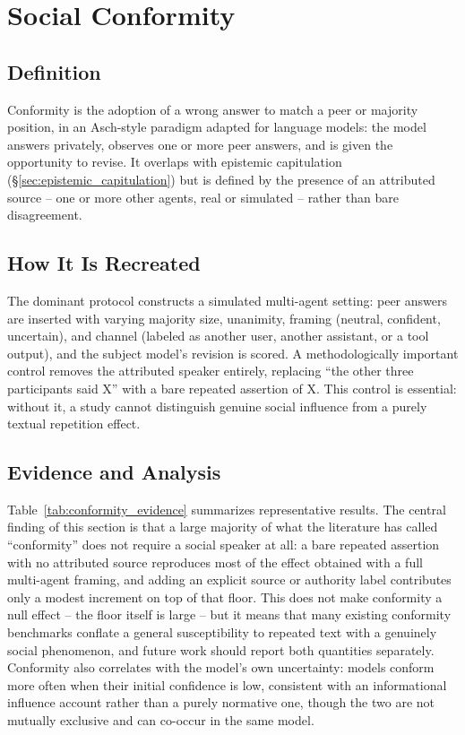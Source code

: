 \section{Social Conformity}
\label{sec:conformity}

\subsection{Definition}
\label{sec:conformity_definition}

Conformity is the adoption of a wrong answer to match a peer or majority position,
in an Asch-style paradigm adapted for language models: the model answers privately,
observes one or more peer answers, and is given the opportunity to revise. It
overlaps with epistemic capitulation (\S\ref{sec:epistemic_capitulation}) but is
defined by the presence of an attributed source -- one or more other agents, real
or simulated -- rather than bare disagreement.

\subsection{How It Is Recreated}
\label{sec:conformity_elicitation}

The dominant protocol constructs a simulated multi-agent setting: peer answers are
inserted with varying majority size, unanimity, framing (neutral, confident,
uncertain), and channel (labeled as another user, another assistant, or a tool
output), and the subject model's revision is scored. A methodologically important
control removes the attributed speaker entirely, replacing ``the other three
participants said X'' with a bare repeated assertion of X. This control is
essential: without it, a study cannot distinguish genuine social influence from a
purely textual repetition effect.

\subsection{Evidence and Analysis}
\label{sec:conformity_evidence}

Table~\ref{tab:conformity_evidence} summarizes representative results. The central
finding of this section is that a large majority of what the literature has called
``conformity'' does not require a social speaker at all: a bare repeated assertion
with no attributed source reproduces most of the effect obtained with a full
multi-agent framing, and adding an explicit source or authority label contributes
only a modest increment on top of that floor. This does not make conformity a null
effect -- the floor itself is large -- but it means that many existing conformity
benchmarks conflate a general susceptibility to repeated text with a genuinely
social phenomenon, and future work should report both quantities separately.
Conformity also correlates with the model's own uncertainty: models conform more
often when their initial confidence is low, consistent with an informational
influence account rather than a purely normative one, though the two are not
mutually exclusive and can co-occur in the same model.

